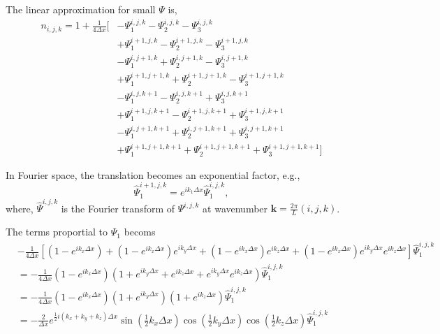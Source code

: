 \documentclass[a4paper,11pt]{article}
\begin{document}
The linear approximation for small $\Psi$ is,
\begin{equation}
  \label{eq:n-linear}
\begin{split}
  n_{i,j,k} = 1 + \frac{1}{4 \Delta x} \Big[
   & - \Psi_1^{i,   j,   k  } - \Psi_2^{i,   j,   k  } - \Psi_3^{i,   j,   k  }\\
   & + \Psi_1^{i+1, j,   k  } - \Psi_2^{i+1, j,   k  } - \Psi_3^{i+1, j,   k  }\\
   & - \Psi_1^{i,   j+1, k  } + \Psi_2^{i,   j+1, k  } - \Psi_3^{i,   j+1, k  }\\
   & + \Psi_1^{i+1, j+1, k  } + \Psi_2^{i+1, j+1, k  } - \Psi_3^{i+1, j+1, k  }\\
   & - \Psi_1^{i,   j  , k+1} - \Psi_2^{i,   j  , k+1} + \Psi_3^{i,   j  , k+1}\\
   & + \Psi_1^{i+1, j  , k+1} - \Psi_2^{i+1, j  , k+1} + \Psi_3^{i+1, j  , k+1}\\
   & - \Psi_1^{i,   j+1, k+1} + \Psi_2^{i,   j+1, k+1} + \Psi_3^{i,   j+1, k+1}\\
   & + \Psi_1^{i+1, j+1, k+1} + \Psi_2^{i+1, j+1, k+1} + \Psi_3^{i+1, j+1, k+1}
   \Big]
\end{split}
\end{equation}

In Fourier space, the translation becomes an exponential factor, e.g., 
\begin{equation}
  \hat{\Psi}_1^{i+1, j, k} = e^{i k_1 \Delta x} \hat{\Psi}_1^{i,j,k},
\end{equation}
where, $\hat{\Psi}^{i,j,k}$ is the Fourier transform of $\Psi^{i, j, k}$
at wavenumber $\bm{k} = \frac{2\pi}{L} (i, j, k)$.

The terms proportial to $\Psi_1$ becoms
\begin{equation}
\begin{split}
  &-\frac{1}{4\Delta x} \left[
    (1 - e^{i k_x \Delta x}) + (1 - e^{i k_x \Delta x}) e^{i k_y \Delta x}
    + (1 - e^{i k_x \Delta x}) e^{i k_z \Delta x}
    + (1 - e^{i k_x \Delta x}) e^{i k_y \Delta x} e^{i k_z \Delta x} \right]
  \hat{\Psi}_1^{i, j, k}\\
  &= -\frac{1}{4 \Delta x}
       (1 - e^{i k_x \Delta x})(1 + e^{i k_y \Delta x} + e^{i k_z \Delta x} +
         e^{i k_y \Delta x} e^{i k_z \Delta x}) \hat{\Psi}_1^{i,j,k}\\
  &= -\frac{1}{4 \Delta x}
         (1 - e^{i k_x \Delta x})(1 + e^{i k_y \Delta x})(1 +  e^{i k_z \Delta x})
         \hat{\Psi}_1^{i,j,k}\\
  &= -\frac{2}{\Delta x} e^{\frac{1}{2} i (k_x + k_y + k_z) \Delta x} 
         \sin \left( \frac{1}{2} k_x \Delta x \right)
         \cos \left( \frac{1}{2} k_y \Delta x \right)
         \cos \left(\frac{1}{2} k_z \Delta x \right)
         \hat{\Psi}_1^{i,j,k}
\end{split}
\end{equation}
\end{document}
